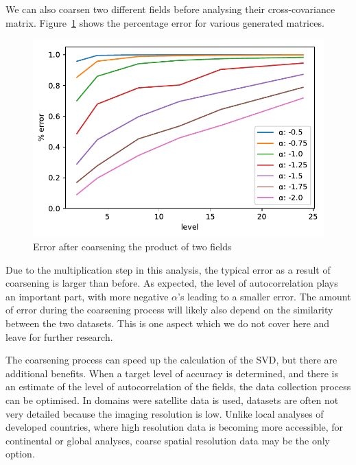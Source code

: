 \documentclass{acm_proc_article-sp}
\begin{document}
We can also coarsen two different fields before analysing their cross-covariance matrix. Figure~\ref{fig:plotProductSpatialTemporalFieldsViaCoarsening} shows the percentage error for various generated matrices.

\begin{figure}[h]
\begin{center}
\includegraphics[width=0.8\columnwidth]{Results/plotProductSpatialTemporalFieldsViaCoarsening.pdf}
\caption[Error after coarsening product of fields]{Error after coarsening the product of two fields}
\label{fig:plotProductSpatialTemporalFieldsViaCoarsening}
\end{center}
\end{figure}
Due to the multiplication step in this analysis, the typical error as a result of coarsening is larger than before. As expected, the level of autocorrelation plays an important part, with more negative $\alpha$'s leading to a smaller error. The amount of error during the coarsening process will likely also depend on the similarity between the two datasets. This is one aspect which we do not cover here and leave for further research.

The coarsening process can speed up the calculation of the SVD, but there are additional benefits. When a target level of accuracy is determined, and there is an estimate of the level of autocorrelation of the fields, the data collection process can be optimised. In domains were satellite data is used, datasets are often not very detailed because the imaging resolution is low. Unlike local analyses of developed countries, where high resolution data is becoming more accessible, for continental or global analyses, coarse spatial resolution data may be the only option.
\end{document}
